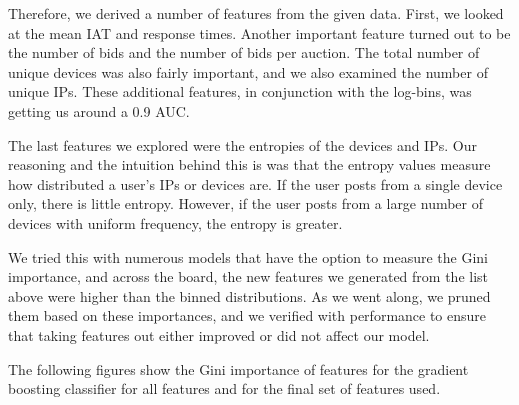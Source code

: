 \documentclass{article} %
\begin{document}
Therefore, we derived a number of features from the given data.
First, we looked at the mean IAT and response times.
Another important feature turned out to be the number of bids and the number of bids per auction.
The total number of unique devices was also fairly important, and we also examined the number of unique IPs.
These additional features, in conjunction with the log-bins, was getting us around a 0.9 AUC.

The last features we explored were the entropies of the devices and IPs.
Our reasoning and the intuition behind this is was that the entropy values measure how distributed a user's IPs or devices are.
If the user posts from a single device only, there is little entropy.
However, if the user posts from a large number of devices with uniform frequency, the entropy is greater.

We tried this with numerous models that have the option to measure the Gini importance, and across the board, the new features we generated from the list above were higher than the binned distributions.
As we went along, we pruned them based on these importances, and we verified with performance to ensure that taking features out either improved or did not affect our model.

The following figures show the Gini importance of features for the gradient boosting classifier for all features and for the final set of features used.

\begin{figure}[h]
    \centering
    \qquad
\end{figure}
\end{document}

